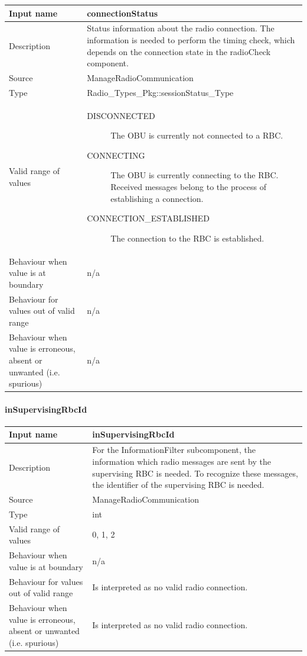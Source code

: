 \begin{longtable}{p{}p{}}
\toprule
Input name				& connectionStatus \\
\midrule
Description				& Status information about the radio connection. The information is needed to perform the timing check, which depends on the connection state in the radioCheck component. \\
\midrule
Source					& ManageRadioCommunication \\ 
\midrule
Type					& Radio\_Types\_Pkg::sessionStatus\_Type \\
\midrule
Valid range of values	& 
\begin{description}
\item[DISCONNECTED] The OBU is currently not connected to a RBC.
\item[CONNECTING] The OBU is currently connecting to the RBC. Received messages belong to the process of establishing a connection.
\item[CONNECTION\_ESTABLISHED] The connection to the RBC is established.
\end{description} \\
\midrule
Behaviour when value is at boundary	& n/a\\
\midrule
Behaviour for values out of valid range	& n/a\\
\midrule
Behaviour when value is erroneous, absent or unwanted (i.e. spurious) & n/a\\
\bottomrule
\end{longtable}


\paragraph{inSupervisingRbcId}

\begin{longtable}{p{}p{}}
\toprule
Input name				& inSupervisingRbcId \\
\midrule
Description				& For the InformationFilter subcomponent, the information which radio messages are sent by the supervising RBC is needed. To recognize these messages, the identifier of the supervising RBC is needed. \\
\midrule
Source					& ManageRadioCommunication\\ 
\midrule
Type					& int \\
\midrule
Valid range of values	& 0, 1, 2
 \\
\midrule
Behaviour when value is at boundary	& n/a\\
\midrule
Behaviour for values out of valid range	&  Is interpreted as no valid radio connection.\\
\midrule
Behaviour when value is erroneous, absent or unwanted (i.e. spurious) & Is interpreted as no valid radio connection.\\
\bottomrule
\end{longtable}


